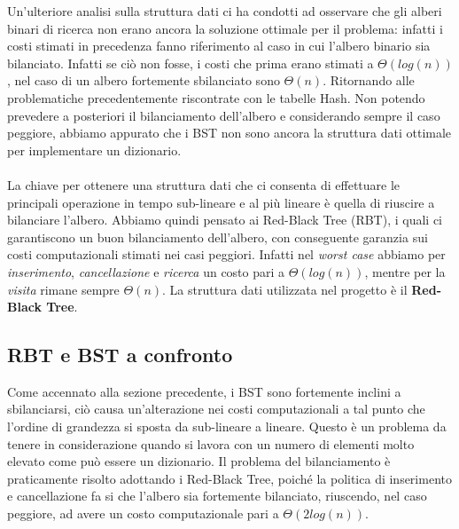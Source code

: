 \documentclass[paper=a4, fontsize=11pt,twoside]{scrartcl}   %
\begin{document}
				 Un'ulteriore analisi sulla struttura dati ci ha condotti ad osservare che gli alberi binari di ricerca non erano ancora la soluzione ottimale per il problema: infatti i costi stimati in precedenza fanno riferimento al caso in cui l'albero binario sia bilanciato. Infatti se ciò non fosse, i costi che prima erano stimati a $\Theta(log(n))$, nel caso di un albero fortemente sbilanciato sono $\Theta(n)$. Ritornando alle problematiche precedentemente riscontrate con le tabelle Hash. Non potendo prevedere a posteriori il bilanciamento dell'albero e considerando sempre il caso peggiore, abbiamo appurato che i BST non sono ancora la struttura dati ottimale per implementare un dizionario.\\\\
				 La chiave per ottenere una struttura dati che ci consenta di effettuare le principali operazione in tempo sub-lineare e al più lineare è quella di riuscire a bilanciare l'albero.
				 Abbiamo quindi pensato ai Red-Black Tree (RBT), i quali ci garantiscono un buon bilanciamento dell'albero, con conseguente garanzia sui costi computazionali stimati nei casi peggiori. Infatti nel \textit{worst case} abbiamo 
				 per \textit{inserimento}, \textit{cancellazione} e \textit{ricerca} un costo pari a $\Theta(log(n))$, mentre per la \textit{visita} rimane sempre $\Theta(n)$. La struttura dati utilizzata nel progetto è il \textbf{Red-Black Tree}.
				 
			\subsection{RBT e BST a confronto}
				Come accennato alla sezione precedente, i BST sono fortemente inclini a sbilanciarsi, ciò causa un'alterazione nei costi computazionali a tal punto che l'ordine di grandezza si sposta da sub-lineare a lineare. Questo è un problema da tenere in considerazione quando si lavora con un numero di elementi molto elevato come può essere un dizionario.
				Il problema del bilanciamento è praticamente risolto adottando i Red-Black Tree, poiché la politica di inserimento e cancellazione fa si che l'albero sia fortemente bilanciato, riuscendo, nel caso peggiore, ad avere un costo computazionale pari a $\Theta(2log(n))$.
			
\end{document}

